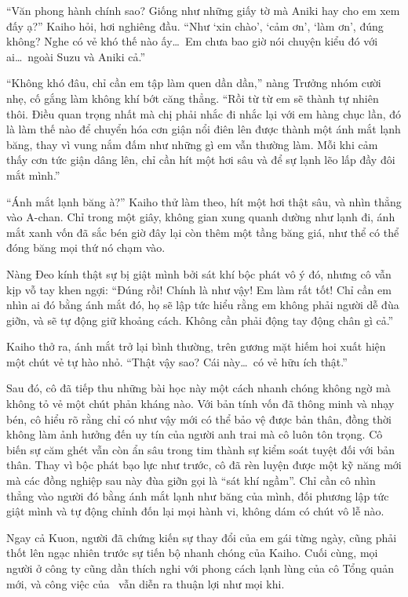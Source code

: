\documentclass[../main.tex]{subfiles}
\begin{document}
``Văn phong hành chính sao? Giống như những giấy tờ mà Aniki hay cho em xem đấy ạ?'' Kaiho hỏi, hơi nghiêng đầu. ``Như `xin chào', `cảm ơn', `làm ơn', đúng không? Nghe có vẻ khó thế nào ấy\dots\ Em chưa bao giờ nói chuyện kiểu đó với ai\dots\ ngoài Suzu và Aniki cả.''

``Không khó đâu, chỉ cần em tập làm quen dần dần,'' nàng Trưởng nhóm cười nhẹ, cố gắng làm không khí bớt căng thẳng. ``Rồi từ từ em sẽ thành tự nhiên thôi. Điều quan trọng nhất mà chị phải nhắc đi nhắc lại với em hàng chục lần, đó là làm thế nào để chuyển hóa cơn giận nổi điên lên được thành một ánh mắt lạnh băng, thay vì vung nắm đấm như những gì em vẫn thường làm. Mỗi khi cảm thấy cơn tức giận dâng lên, chỉ cần hít một hơi sâu và để sự lạnh lẽo lấp đầy đôi mắt mình.''

``Ánh mắt lạnh băng à?'' Kaiho thử làm theo, hít một hơi thật sâu, và nhìn thẳng vào A-chan. Chỉ trong một giây, không gian xung quanh dường như lạnh đi, ánh mắt xanh vốn đã sắc bén giờ đây lại còn thêm một tầng băng giá, như thể có thể đóng băng mọi thứ nó chạm vào.

Nàng Đeo kính thật sự bị giật mình bởi sát khí bộc phát vô ý đó, nhưng cô vẫn kịp vỗ tay khen ngợi: ``Đúng rồi! Chính là như vậy! Em làm rất tốt! Chỉ cần em nhìn ai đó bằng ánh mắt đó, họ sẽ lập tức hiểu rằng em không phải người dễ đùa giỡn, và sẽ tự động giữ khoảng cách. Không cần phải động tay động chân gì cả.''

Kaiho thở ra, ánh mắt trở lại bình thường, trên gương mặt hiếm hoi xuất hiện một chút vẻ tự hào nhỏ. ``Thật vậy sao? Cái này\dots\ có vẻ hữu ích thật.''

Sau đó, cô đã tiếp thu những bài học này một cách nhanh chóng không ngờ mà không tỏ vẻ một chút phản kháng nào. Với bản tính vốn đã thông minh và nhạy bén, cô hiểu rõ rằng chỉ có như vậy mới có thể bảo vệ được bản thân, đồng thời không làm ảnh hưởng đến uy tín của người anh trai mà cô luôn tôn trọng. Cô biến sự căm ghét vẫn còn ẩn sâu trong tim thành sự kiểm soát tuyệt đối với bản thân. Thay vì bộc phát bạo lực như trước, cô đã rèn luyện được một kỹ năng mới mà các đồng nghiệp sau này đùa giỡn gọi là ``sát khí ngầm''. Chỉ cần cô nhìn thẳng vào người đó bằng ánh mắt lạnh như băng của mình, đối phương lập tức giật mình và tự động chỉnh đốn lại mọi hành vi, không dám có chút vô lễ nào.

Ngay cả Kuon, người đã chứng kiến sự thay đổi của em gái từng ngày, cũng phải thốt lên ngạc nhiên trước sự tiến bộ nhanh chóng của Kaiho. Cuối cùng, mọi người ở công ty cũng dần thích nghi với phong cách lạnh lùng của cô Tổng quản mới, và công việc của \hls\ vẫn diễn ra thuận lợi như mọi khi.
\end{document}
